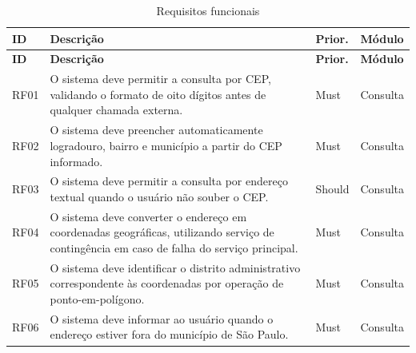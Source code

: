\begin{longtable}{C{1.2cm}L{9.2cm}C{1.5cm}C{2.2cm}}
	\caption{Requisitos funcionais}
	\label{qua:rf}                                                                                                                                                                                                                                \\
	\toprule
	\textbf{ID} & \textbf{Descrição}                                                                                                                                                                          & \textbf{Prior.} & \textbf{Módulo} \\
	\midrule
	\endfirsthead
	\toprule
	\textbf{ID} & \textbf{Descrição}                                                                                                                                                                          & \textbf{Prior.} & \textbf{Módulo} \\
	\midrule
	\endhead
	\bottomrule
	\endfoot
	RF01        & O sistema deve permitir a consulta por CEP, validando o formato de oito dígitos antes de qualquer chamada externa.                                                                          & Must            & Consulta        \\
	RF02        & O sistema deve preencher automaticamente logradouro, bairro e município a partir do CEP informado.                                                                                          & Must            & Consulta        \\
	RF03        & O sistema deve permitir a consulta por endereço textual quando o usuário não souber o CEP.                                                                                                  & Should          & Consulta        \\
	RF04        & O sistema deve converter o endereço em coordenadas geográficas, utilizando serviço de contingência em caso de falha do serviço principal.                                                   & Must            & Consulta        \\
	RF05        & O sistema deve identificar o distrito administrativo correspondente às coordenadas por operação de ponto-em-polígono.                                                                       & Must            & Consulta        \\
	RF06        & O sistema deve informar ao usuário quando o endereço estiver fora do município de São Paulo.                                                                                                & Must            & Consulta        \\

\end{longtable}
